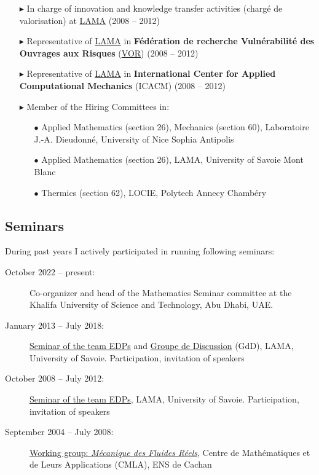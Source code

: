 \begin{itemize}
        \item[$\blacktriangleright$] In charge of innovation and knowledge transfer activities (charg\'e de valorisation) at \href{http://www.lama.univ-savoie.fr}{LAMA} (2008 -- 2012)
        \item[$\blacktriangleright$] Representative of \href{http://www.lama.univ-savoie.fr/}{LAMA} in \textbf{F\'ed\'eration de recherche Vuln\'erabilit\'e des Ouvrages aux Risques} (\href{http://vor.grenoble-inp.fr}{VOR}) (2008 -- 2012)
        \item[$\blacktriangleright$] Representative of \href{http://www.lama.univ-savoie.fr/}{LAMA} in \textbf{International Center for Applied Computational Mechanics} (ICACM) (2008 -- 2012)
        \item[$\blacktriangleright$] Member of the Hiring Committees in:
        \begin{itemize}
            \item[$\bullet$] Applied Mathematics (section 26), Mechanics (section 60), Laboratoire J.-A. Dieudonn\'e, University of Nice Sophia Antipolis
            \item[$\bullet$] Applied Mathematics (section 26), LAMA, University of Savoie Mont Blanc
            \item[$\bullet$] Thermics (section 62), LOCIE, Polytech Annecy Chamb\'ery
        \end{itemize}
    \end{itemize}

    \separator
    \subsection{Seminars}
    During past years I actively participated in running following seminars:
    \begin{description}
        \item[October 2022 -- present:] Co-organizer and head of the Mathematics Seminar committee at the Khalifa University of Science and Technology, Abu Dhabi, UAE.
        \item[January 2013 -- July 2018:] \href{http://www.lama.univ-savoie.fr/index.php?use=seminaires&equipe=edp&lang=en}{Seminar of the team EDPs} and \href{https://www.lama.univ-savoie.fr/~garnier/fr.GdD_EDP2.html}{Groupe de Discussion} (GdD), LAMA, University of Savoie. Participation, invitation of speakers
        \item[October 2008 -- July 2012:] \href{http://www.lama.univ-savoie.fr/index.php?use=seminaires&equipe=edp&lang=en}{Seminar of the team EDPs}, LAMA, University of Savoie. Participation, invitation of speakers
        \item[September 2004 -- July 2008:] \href{http://www.cmla.ens-cachan.fr/la-recherche/groupes-de-travail/gdtmf.html}{Working group: \textit{M\'ecanique des Fluides R\'eels}}, Centre de Math\'ematiques et de Leurs Applications (CMLA), ENS de Cachan
    \end{description}

